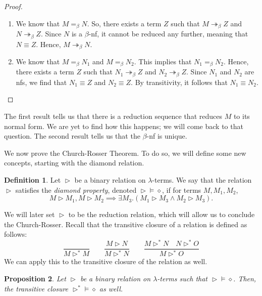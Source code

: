 \documentclass[a4paper, openany]{memoir}
\newtheorem{proposition}{Proposition}[section]
\theoremstyle{definition}
\newtheorem{definition}[proposition]{Definition}
\begin{document}
    \begin{proof}
        \hspace*{0pt}
        \begin{enumerate}
            \item We know that $M =_\beta N$. So, there exists a term $Z$ such that $M \twoheadrightarrow_\beta Z$ and $N \twoheadrightarrow_\beta Z$. Since $N$ is a $\beta$-nf, it cannot be reduced any further, meaning that $N \equiv Z$. Hence, $M \twoheadrightarrow_\beta N$.
            
            \item We know that $M =_\beta N_1$ and $M =_\beta N_2$. This implies that $N_1 =_\beta N_2$. Hence, there exists a term $Z$ such that $N_1 \twoheadrightarrow_\beta Z$ and $N_2 \twoheadrightarrow_\beta Z$. Since $N_1$ and $N_2$ are nfs, we find that $N_1 \equiv Z$ and $N_2 \equiv Z$. By transitivity, it follows that $N_1 \equiv N_2$.
        \end{enumerate}
    \end{proof}
    \noindent The first result tells us that there is a reduction sequence that reduces $M$ to its normal form. We are yet to find how this happens; we will come back to that question. The second result tells us that the $\beta$-nf is unique.

    We now prove the Church-Rosser Theorem. To do so, we will define some new concepts, starting with the diamond relation.
    \begin{definition}
        Let $\vartriangleright$ be a binary relation on $\lambda$-terms. We say that the relation $\vartriangleright$ satisfies the \emph{diamond property}, denoted $\vartriangleright {\vDash \diamond}$, if for terms $M, M_1, M_2$,
        \[M \vartriangleright M_1, M \vartriangleright M_2 \implies \exists M_3 . (M_1 \vartriangleright M_3 \land M_2 \vartriangleright M_3).\]
    \end{definition}
    \noindent We will later set $\vartriangleright$ to be the reduction relation, which will allow us to conclude the Church-Rosser. Recall that the transitive closure of a relation is defined as follows:
    \[\frac{}{M \vartriangleright^* M} \qquad \frac{M \vartriangleright N}{M \vartriangleright^* N} \qquad \frac{M \vartriangleright^* N \quad N \vartriangleright^* O}{M \vartriangleright^* O}\]
    We can apply this to the transitive closure of the relation as well. 
    \begin{proposition}
        Let $\vartriangleright$ be a binary relation on $\lambda$-terms such that $\vartriangleright {\vDash \diamond}$. Then, the transitive closure $\vartriangleright^* {\vDash \diamond}$ as well.
    \end{proposition}
\end{document}
